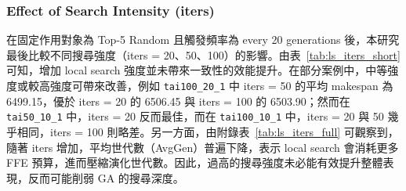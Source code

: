 \documentclass[conference]{IEEEtran}
\begin{document}
\begin{table}[htbp]
\caption{不同頻率做Local Search之平均與最小 Makespan}
\label{tab:ls_when_short}
\centering
{}
\end{table}



\subsubsection{Effect of Search Intensity (iters)}
在固定作用對象為 Top-5 Random 且觸發頻率為 every 20 generations 後，本研究最後比較不同搜尋強度（iters = 20、50、100）的影響。由表~\ref{tab:ls_iters_short} 可知，增加 local search 強度並未帶來一致性的效能提升。在部分案例中，中等強度或較高強度可帶來改善，例如 \texttt{tai100\_20\_1} 中 iters = 50 的平均 makespan 為 6499.15，優於 iters = 20 的 6506.45 與 iters = 100 的 6503.90；然而在 \texttt{tai50\_10\_1} 中，iters = 20 反而最佳，而在 \texttt{tai100\_10\_1} 中，iters = 20 與 50 幾乎相同，iters = 100 則略差。另一方面，由附錄表~\ref{tab:ls_iters_full} 可觀察到，隨著 iters 增加，平均世代數（AvgGen）普遍下降，表示 local search 會消耗更多 FFE 預算，進而壓縮演化世代數。因此，過高的搜尋強度未必能有效提升整體表現，反而可能削弱 GA 的搜尋深度。
\end{document}
